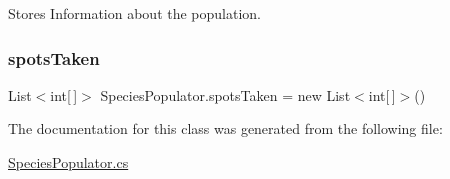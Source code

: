 Stores Information about the population. 

\mbox{\label{class_species_populator_a795ce62b0794ced8ac231dab8a836c1d}} 
\subsubsection{\texorpdfstring{spots\+Taken}{spotsTaken}}
{\footnotesize\ttfamily List$<$int\mbox{[}$\,$\mbox{]}$>$ Species\+Populator.\+spots\+Taken = new List$<$int\mbox{[}$\,$\mbox{]}$>$()}



The documentation for this class was generated from the following file\+:\begin{DoxyCompactItemize}
\item 
\mbox{\hyperlink{_species_populator_8cs}{Species\+Populator.\+cs}}\end{DoxyCompactItemize}
